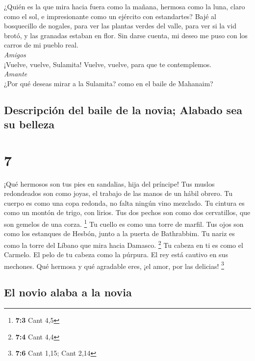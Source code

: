  ¿Quién es la que mira hacia fuera como la mañana,
hermosa como la luna, claro como el sol, e impresionante como un
ejército con estandartes?  Bajé al bosquecillo de
nogales, para ver las plantas verdes del valle, para ver si la vid
brotó, y las granadas estaban en flor.  Sin darse cuenta,
mi deseo me puso con los carros de mi pueblo real.\\
\emph{Amigos}\\
 ¡Vuelve, vuelve, Sulamita! Vuelve, vuelve, para que te
contemplemos.\\
\emph{Amante}\\
¿Por qué deseas mirar a la Sulamita? como en el baile de Mahanaim?

\hypertarget{descripciuxf3n-del-baile-de-la-novia-alabado-sea-su-belleza}{%
\subsection{Descripción del baile de la novia; Alabado sea su
belleza}\label{descripciuxf3n-del-baile-de-la-novia-alabado-sea-su-belleza}}

\hypertarget{section-6}{%
\section{7}\label{section-6}}

 ¡Qué hermosos son tus pies en sandalias, hija del
príncipe! Tus muslos redondeados son como joyas, el trabajo de las manos
de un hábil obrero.  Tu cuerpo es como una copa redonda,
no falta ningún vino mezclado. Tu cintura es como un montón de trigo,
con lirios.  Tus dos pechos son como dos cervatillos, que
son gemelos de una corza. \footnote{\textbf{7:3} Cant 4,5}
 Tu cuello es como una torre de marfil. Tus ojos son como
los estanques de Hesbón, junto a la puerta de Bathrabbim. Tu nariz es
como la torre del Líbano que mira hacia Damasco. \footnote{\textbf{7:4}
  Cant 4,4}  Tu cabeza en ti es como el Carmelo. El pelo
de tu cabeza como la púrpura. El rey está cautivo en sus mechones.
 Qué hermosa y qué agradable eres, ¡el amor, por las
delicias! \footnote{\textbf{7:6} Cant 1,15; Cant 2,14}

\hypertarget{el-novio-alaba-a-la-novia}{%
\subsection{El novio alaba a la novia}\label{el-novio-alaba-a-la-novia}}

